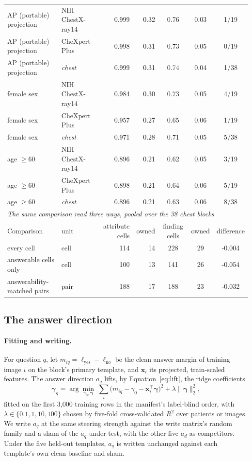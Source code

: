 \documentclass[11pt]{article}
\begin{document}
\begin{table}[tp]
{\begin{tabular}{llrrccc}
\midrule
AP (portable) projection & NIH ChestX-ray14 & 0.999 & 0.32 & 0.76 & 0.03 & 1/19 \\
AP (portable) projection & CheXpert Plus & 0.998 & 0.31 & 0.73 & 0.05 & 0/19 \\
AP (portable) projection & \textit{chest} & 0.999 & 0.31 & 0.74 & 0.04 & 1/38 \\
female sex & NIH ChestX-ray14 & 0.984 & 0.30 & 0.73 & 0.05 & 4/19 \\
female sex & CheXpert Plus & 0.957 & 0.27 & 0.65 & 0.06 & 1/19 \\
female sex & \textit{chest} & 0.971 & 0.28 & 0.71 & 0.05 & 5/38 \\
age $\geq60$ & NIH ChestX-ray14 & 0.896 & 0.21 & 0.62 & 0.05 & 3/19 \\
age $\geq60$ & CheXpert Plus & 0.898 & 0.21 & 0.64 & 0.06 & 5/19 \\
age $\geq60$ & \textit{chest} & 0.896 & 0.21 & 0.63 & 0.06 & 8/38 \\
\midrule
\multicolumn{7}{l}{\textit{The same comparison read three ways, pooled over the 38 chest blocks}} \\
Comparison & unit & attribute cells & owned & finding cells & owned & difference \\
\midrule
every cell & cell & 114 & 14 & 228 & 29 & -0.004 \\
answerable cells only & cell & 100 & 13 & 141 & 26 & -0.054 \\
answerability-matched pairs & pair & 188 & 17 & 188 & 23 & -0.032 \\
\bottomrule
\end{tabular}}
\end{table}


\subsection{The answer direction}
\label{app:cf-ansdir}

\paragraph{Fitting and writing.} For question $q$, let $m_{iq}=\ell_{\mathrm{yes}}-\ell_{\mathrm{no}}$ be the clean answer margin of training image $i$ on the block's primary template, and $\boldsymbol x_i$ its projected, train-scaled features. The answer direction $a_q$ lifts, by Equation~\ref{eq:lift}, the ridge coefficients
\begin{equation}
\boldsymbol\gamma_q=\arg\min_{\gamma_0,\boldsymbol\gamma}\;\sum_{i}\bigl(m_{iq}-\gamma_0-\boldsymbol x_i^{\top}\boldsymbol\gamma\bigr)^2+\lambda\lVert\boldsymbol\gamma\rVert_2^2 ,
\label{eq:answer-direction}
\end{equation}
fitted on the first 3{,}000 training rows in the manifest's label-blind order, with $\lambda\in\{0.1,1,10,100\}$ chosen by five-fold cross-validated $R^2$ over patients or images. We write $a_q$ at the same steering strength against the write matrix's random family and a sham of the $a_q$ under test, with the other five $a_d$ as competitors. Under the five held-out templates, $a_q$ is written unchanged against each template's own clean baseline and sham.
\end{document}
